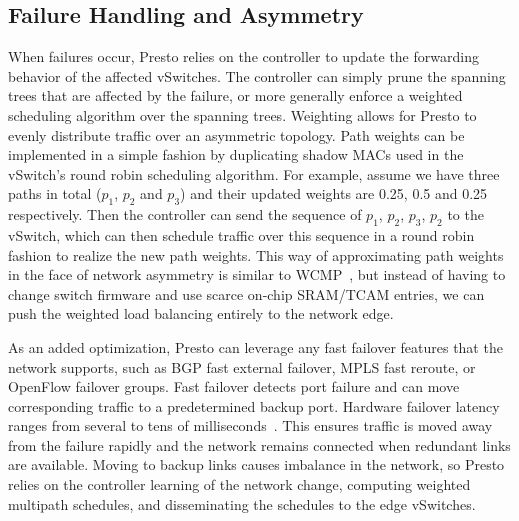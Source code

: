 

\subsection{Failure Handling and Asymmetry}
When failures occur, Presto relies on the controller to update the forwarding
behavior of the affected vSwitches. The controller can simply prune the spanning
trees that are affected by the failure, or more generally enforce a weighted
scheduling algorithm over the spanning trees.
Weighting allows for Presto to evenly distribute traffic over an asymmetric topology.
Path weights can be implemented in a simple fashion by duplicating shadow MACs used in
the vSwitch's round robin scheduling algorithm.
For example, assume we have three paths in total ($p_1$, $p_2$ and $p_3$) and their updated weights are 0.25, 0.5 and 0.25 respectively.
Then the controller can send the sequence of $p_1$, $p_2$, $p_3$, $p_2$ to the vSwitch, which
can then schedule traffic over this sequence in a round robin fashion to realize the new path weights.
This way of approximating path weights in the face of network
asymmetry is similar to WCMP~\cite{wcmp}, but instead of having to change switch firmware and use
scarce on-chip SRAM/TCAM entries, we can push the weighted load balancing entirely to the network edge.

As an added optimization, Presto can leverage any fast failover features that 
the network supports, such as BGP fast external failover, MPLS fast reroute, or OpenFlow failover groups. Fast failover detects port failure and can move corresponding traffic
to a predetermined backup port. Hardware failover latency ranges from several to tens of milliseconds~\cite{ipblog-failover,huawei-failover}.
This ensures traffic is moved away from the failure rapidly and the network
remains connected when redundant links are available.
Moving to backup links causes imbalance in the network,
so Presto relies on the controller learning of the network change, computing weighted multipath schedules, and
disseminating the schedules to the edge vSwitches. 

